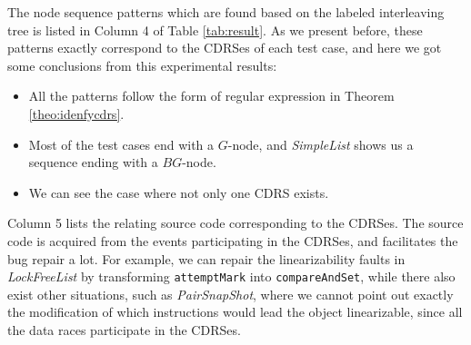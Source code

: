 \documentclass[runningheads]{llncs}
\begin{document}

The node sequence patterns which are found based on the labeled interleaving tree is listed in Column 4 of Table \ref{tab:result}. 
As we present before, these patterns exactly correspond to the CDRSes of each test case, and here we got some conclusions from this experimental results:
\begin{itemize}
\item All the patterns follow the form of regular expression in Theorem \ref{theo:idenfycdrs}. 
\item Most of the test cases end with a $G$-node, and \textit{SimpleList} shows us a sequence ending with a $BG$-node.
\item We can see the case where not only one CDRS exists. 
\end{itemize}

Column 5 lists the relating source code corresponding to the CDRSes. The source code is acquired from the events participating in the CDRSes, and facilitates the bug repair a lot. For example, we can repair the linearizability faults in \textit{LockFreeList} by transforming \texttt{attemptMark} into \texttt{compareAndSet}, while there also exist other situations, such as \textit{PairSnapShot}, where we cannot point out exactly the modification of which instructions would lead the object linearizable, since all the data races participate in the CDRSes.





\end{document}
